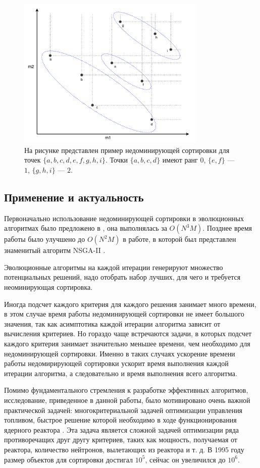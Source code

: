 \begin{figure}[!h]
\begin{center}
\includegraphics[width=9cm]{pic/non_dominated_sort.png}
\caption{На рисунке представлен пример недоминирующей сортировки для точек $\{a,b,c,d,e,f,g,h,i\}$.
Точки $\{a,b,c,d\}$ имеют ранг $0$, $\{e,f\}$ {---} $1$, $\{g,h,i\}$ {---} $2$.}
\label{nds}
\end{center}
\end{figure}

\subsection{Применение и актуальность}

Первоначально использование недоминирующей сортировки в эволюционных алгоритмах было предложено в \cite{Srinivas}, она выполнялась за $O(N^3M)$. Позднее время работы было улучшено до $O(N^2M)$ в работе, в которой был представлен знаменитый алгоритм NSGA-II \cite{NSGA-II}.

Эволюционные алгоритмы на каждой итерации генерируют множество потенциальных решений, надо отобрать набор лучших, для чего и требуется неоминирующая сортировка. 

Иногда подсчет каждого критерия для каждого решения занимает много времени, в этом случае время работы недоминирующей сортировки не имеет большого значения, так как асимптотика каждой итерации алгоритма зависит от вычисления критериев. Но гораздо чаще встречаются задачи, в которых подсчет каждого критерия занимает значительно меньшее времени, чем необходимо для недоминирующей сортировки. Именно в таких случаях ускорение времени работы недомирирующей сортировки ускорит время выполнения каждой итерации алгоритма, а следовательно и время выполнения всего алгоритма.

Помимо фундаментального стремления к разработке эффективных алгоритмов, исследование, приведенное в данной работы, было мотивировано очень важной практической задачей: многокритериальной задачей оптимизации управления топливом, быстрое решение которой необходимо в ходе функционирования ядерного реактора \cite{Schlunz}. Эта задача является сложной задачей оптимизации ряда противоречащих друг другу критериев, таких как мощность, получаемая от реактора, количество нейтронов, вылетающих из реактора и т. д. В 1995 году размер объектов для сортировки достигал $10^5$, сейчас он увеличился до $10^6$.

